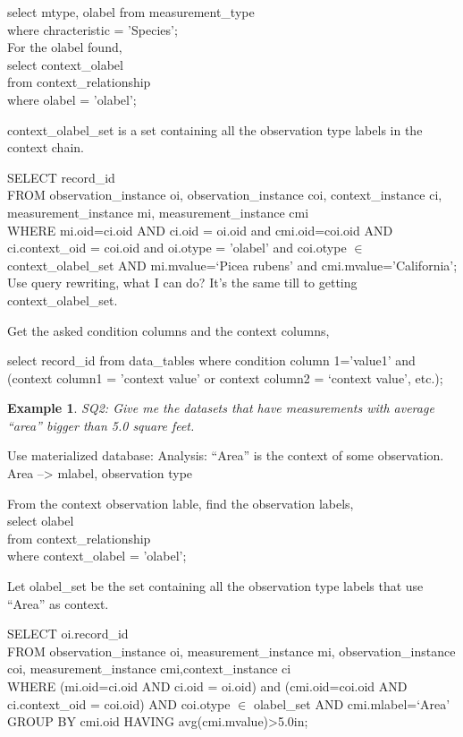 \documentclass[conference]{IEEEtran}
\newtheorem{example}{Example}[section]
\begin{document}
select mtype, olabel from measurement\_type  \\
where chracteristic = 'Species';  \\

For the olabel found, \\
select context\_olabel\\
from context\_relationship\\
where olabel = 'olabel'; 

context\_olabel\_set is a set containing all the observation type
labels in the context chain. 

SELECT record\_id\\
FROM observation\_instance oi, observation\_instance coi,
context\_instance ci,
measurement\_instance mi, measurement\_instance cmi \\
WHERE mi.oid=ci.oid AND ci.oid = oi.oid and  cmi.oid=coi.oid AND ci.context\_oid =
coi.oid and oi.otype = 'olabel' and coi.otype $\in$
context\_olabel\_set
AND mi.mvalue=`Picea rubens' and cmi.mvalue='California';\\

Use query rewriting, what I can do? 
It's the same till to getting context\_olabel\_set. 

Get the asked condition columns and the context columns, 

select record\_id from data\_tables
where condition column 1='value1' and (context column1 = 'context
value' or context column2 = `context value', etc.);

\begin{example}
SQ2: Give me the datasets that have measurements with average ``area''
bigger than 5.0 square feet. 
\end{example}

Use materialized database: 
Analysis: ``Area'' is the context of some observation.
Area --> mlabel, observation type

From the context observation lable, find the observation labels, \\
select olabel\\
from context\_relationship\\
where context\_olabel = 'olabel'; 

Let olabel\_set  be the set containing all the observation type
labels that use ``Area'' as context. 

SELECT oi.record\_id \\
FROM observation\_instance oi, measurement\_instance mi, 
observation\_instance coi, measurement\_instance cmi,context\_instance ci\\
WHERE (mi.oid=ci.oid AND ci.oid = oi.oid) and (cmi.oid=coi.oid AND ci.context\_oid =
coi.oid) AND coi.otype $\in$ olabel\_set 
AND cmi.mlabel=`Area'
GROUP BY cmi.oid
HAVING avg(cmi.mvalue)>5.0in;
\end{document}
